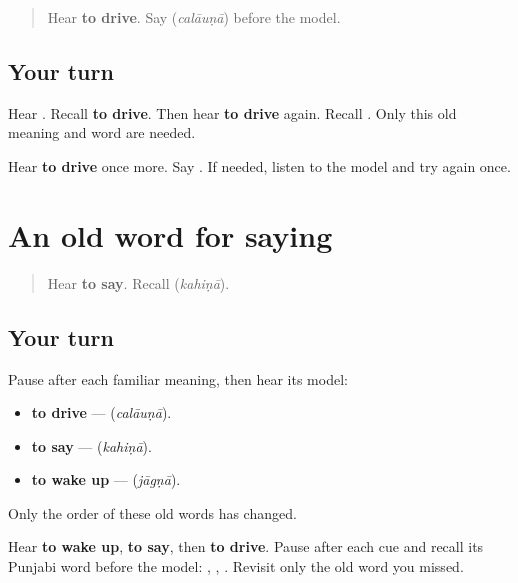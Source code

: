 \label{lesson:PA-R164-drive-again}



\begin{quote}
Hear \textbf{to drive}. Say \textbf{} (\emph{calāuṇā}) before the model.
\end{quote}

\subsection*{Your turn}
Hear \textbf{}. Recall \textbf{to drive}. Then hear \textbf{to drive} again. Recall \textbf{}. Only this old meaning and word are needed.

\begin{tcolorbox}[breakable,colback=teal!4,colframe=teal!35!black,title={Before you move on}]
Hear \textbf{to drive} once more. Say \textbf{}. If needed, listen to the model and try again once.
\end{tcolorbox}
\section[\texorpdfstring{\pa{ਕਹਿਣਾ} (kahiṇā)}{ਕਹਿਣਾ (kahiṇā)}]{An old word for saying}

\label{lesson:PA-R164-say-again}



\begin{quote}
Hear \textbf{to say}. Recall \textbf{} (\emph{kahiṇā}).
\end{quote}

\subsection*{Your turn}
Pause after each familiar meaning, then hear its model:

\begin{itemize}
\raggedright
  \item \textbf{to drive} — \textbf{} (\emph{calāuṇā}).
  \item \textbf{to say} — \textbf{} (\emph{kahiṇā}).
  \item \textbf{to wake up} — \textbf{} (\emph{jāgṇā}).
\end{itemize}

Only the order of these old words has changed.

\begin{tcolorbox}[breakable,colback=teal!4,colframe=teal!35!black,title={Before you move on}]
Hear \textbf{to wake up}, \textbf{to say}, then \textbf{to drive}. Pause after each cue and recall its Punjabi word before the model: \textbf{}, \textbf{}, \textbf{}. Revisit only the old word you missed.
\end{tcolorbox}
